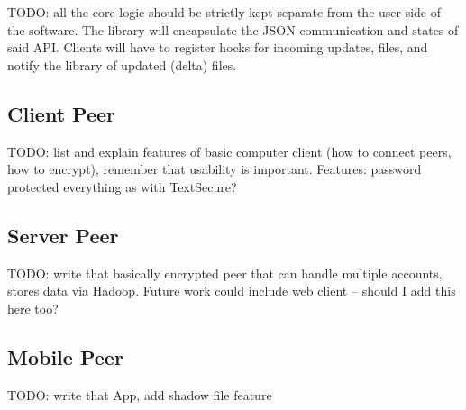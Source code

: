TODO: all the core logic should be strictly kept separate from the user side of the software.
The library will encapsulate the JSON communication and states of said API.
Clients will have to register hocks for incoming updates, files, and notify the library of updated (delta) files.

\subsection{Client Peer}

TODO: list and explain features of basic computer client (how to connect peers, how to encrypt), remember that usability is important.
Features: password protected everything as with TextSecure?

\subsection{Server Peer}

TODO: write that basically encrypted peer that can handle multiple accounts, stores data via Hadoop.
Future work could include web client – should I add this here too?

\subsection{Mobile Peer}

TODO: write that App, add shadow file feature
